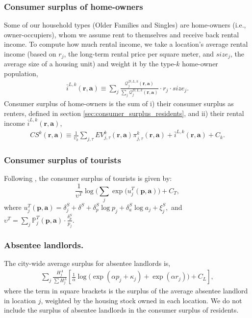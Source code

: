 \documentclass[11pt]{article}
\newcommand{\Prob}{\mathbb{P}}
\begin{document}
\subsubsection{Consumer surplus of home-owners}\label{sec: incorporating rental income}

Some of our household types (Older Families and Singles) are home-owners (i.e., owner-occupiers), whom we assume rent to themselves and receive back rental income. To compute how much rental income, we take a location's average rental income (based on $r_j$, the long-term rental price per square meter, and $size_j$, the average size of a housing unit) and weight it by the type-$k$ home-owner population,
\begin{align}\label{eq:rental_income}
\bar{i}^{L,k}(\mathbf{r},\mathbf{a})\equiv\sum_j \frac{\mathcal{Q}^{D,L,k}_j(\mathbf{r}, \mathbf{a})}{\sum_j \mathcal{Q}^{D,L,k}_j(\mathbf{r}, \mathbf{a})}\cdot r_j\cdot size_j. 
\end{align} 
Consumer surplus of home-owners is the sum of i) their consumer surplus as renters, defined in section \ref{sec:consumer_surplus_residents}, and ii) their rental income $\bar{i}^{L,k}(\mathbf{r},\mathbf{a})$,
\begin{align*}
    CS^k(\mathbf{r},\mathbf{a}) \equiv \frac{1}{\upsilon_k} \sum_{j,\tau} EV^k_{j,\tau} (\mathbf{r},\mathbf{a}) \pi_{j,\tau}^k(\mathbf{r},\mathbf{a}) + \bar{i}^{L,k}(\mathbf{r},\mathbf{a})+ C_k.
\end{align*}

\subsubsection{Consumer surplus of tourists}\label{sec:consumer_surplus_tourists}
Following \cite{train}, the consumer surplus of tourists is given by:
\[ \frac{1}{\upsilon^T}\log \Big( \sum_j \exp(u^T_j(\mathbf{p},\mathbf{a})\Big) + C_T,\]
where $u^T_j(\mathbf{p},\mathbf{a})=\delta_{j}^{S} + \delta^{S}  + \delta_{p}^{S} \log p_{{j}} + \delta_{a}^{S} \log a_{j} + \xi_{{j}}^{S},$ and $\upsilon^T= \sum_j \Prob_j^T(\mathbf{p},\mathbf{a})\cdot \frac{\delta^S_p }{p_j}.$

\subsubsection{Absentee landlords.} The city-wide average surplus for absentee landlords is,
\begin{align*}
   \sum_j  \frac{H_j^A}{\sum H_j^A} \left[ \frac{1}{\alpha}\log\Big(\exp(\alpha p_j + \kappa_j) + \exp(\alpha r_j) \Big) + C_L \right],
\end{align*}
where the term in square brackets is the surplus of the average absentee landlord in location $j$, weighted by the housing stock owned in each location. We do not include the surplus of absentee landlords in the consumer surplus of residents.
\end{document}
